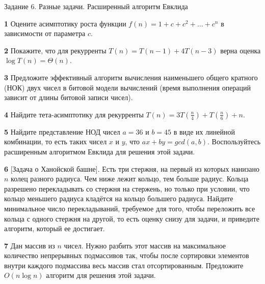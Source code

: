 \documentclass{article}
\begin{document}
\begin{center}
\Large {Задание 6. Разные задачи. Расширенный алгоритм Евклида}
\end{center}

\bigskip

\textbf{1} Оцените асимптотику роста функции $f(n) = 1 + c + c^2 + \dots + c^n$ в зависимости от параметра $c$.

\medskip

\textbf{2} Покажите, что для рекурренты $T(n) = T(n - 1) + 4 T(n - 3)$ верна оценка $\log T(n) = \Theta(n)$.

\medskip

\textbf{3} Предложите эффективный алгоритм вычисления наименьшего общего кратного (НОК) двух чисел в битовой модели вычислений (время выполнения операций зависит от длины битовой записи чисел).

\medskip

\textbf{4} Найдите тета-асимптотику для рекурренты $T(n) = 3 T(\frac{n}{4}) + T(\frac{n}{6}) + n$.

\medskip

\textbf{5} Найдите представление НОД чисел $a = 36$ и $b = 45$ в виде их линейной комбинации, то есть таких чисел $x$ и $y$, что $ax + by = gcd(a, b)$. Воспользуйтесь расширенным алгоритмом Евклида для решения этой задачи.

\medskip

\textbf{6} [Задача о Ханойской башне]. Есть три стержня, на первый из которых нанизано $n$ колец разного радиуса. Чем ниже лежит кольцо, тем больше радиус. Кольца разрешено перекладывать со стержня на стержень, но только при условии, что кольцо меньшего радиуса кладётся на кольцо
большего радиуса. Найдите минимальное число перекладываний, требуемое для того, чтобы переложить все кольца с одного стержня на другой, то есть оценку снизу для задачи, и приведите алгоритм, который ее достигает.

\medskip

\textbf{7} Дан массив из $n$ чисел. Нужно разбить этот массив на максимальное количество непрерывных подмассивов так, чтобы после сортировки элементов внутри каждого подмассива весь массив стал отсортированным. Предложите $O(n \log n)$ алгоритм для решения этой задачи.






\end{document}
